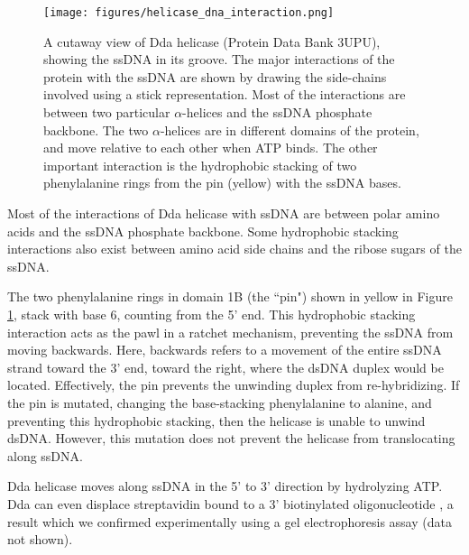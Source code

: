 \begin{figure}[h]
\begin{centering}
\texttt{[image: figures/helicase\_dna\_interaction.png]}
\caption[Dda helicase: interactions with ssDNA]{A cutaway view of Dda helicase (Protein Data Bank 3UPU), showing the ssDNA in its groove.  The major interactions of the protein with the ssDNA are shown by drawing the side-chains involved using a stick representation.  Most of the interactions are between two particular $\alpha$-helices and the ssDNA phosphate backbone.  The two $\alpha$-helices are in different domains of the protein, and move relative to each other when ATP binds.  The other important interaction is the hydrophobic stacking of two phenylalanine rings from the pin (yellow) with the ssDNA bases.}
\label{fig:helicase_ssDNA_interactions}
\end{centering}
\end{figure}

Most of the interactions of Dda helicase with ssDNA are between polar amino acids and the ssDNA phosphate backbone.  Some hydrophobic stacking interactions also exist between amino acid side chains and the ribose sugars of the ssDNA. \citep{He2012}

The two phenylalanine rings in domain 1B (the ``pin") shown in yellow in Figure \ref{fig:helicase_ssDNA_interactions}, stack with base 6, counting from the 5' end.  This hydrophobic stacking interaction acts as the pawl in a ratchet mechanism, preventing the ssDNA from moving backwards.  Here, backwards refers to a movement of the entire ssDNA strand toward the 3' end, toward the right, where the dsDNA duplex would be located.  Effectively, the pin prevents the unwinding duplex from re-hybridizing.  If the pin is mutated, changing the base-stacking phenylalanine to alanine, and preventing this hydrophobic stacking, then the helicase is unable to unwind dsDNA.  However, this mutation does not prevent the helicase from translocating along ssDNA. \citep{He2012}

Dda helicase moves along ssDNA in the 5' to 3' direction by hydrolyzing ATP.  Dda can even displace streptavidin bound to a 3' biotinylated oligonucleotide \citep{Morris1999}, a result which we confirmed experimentally using a gel electrophoresis assay (data not shown). %


